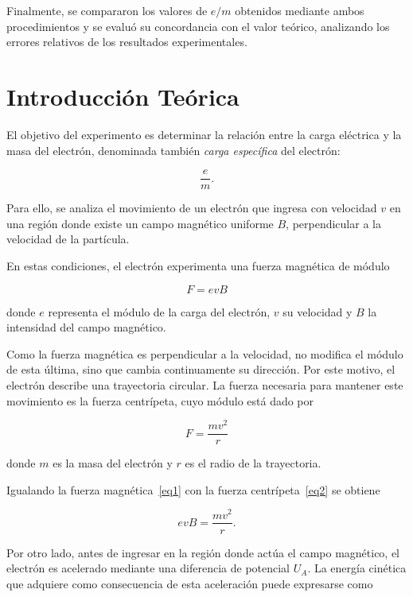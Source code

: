 \documentclass{article}
\begin{document}
Finalmente, se compararon los valores de \(e/m\) obtenidos mediante ambos procedimientos y se evaluó su concordancia con el valor teórico, analizando los errores relativos de los resultados experimentales.


\section{Introducción Teórica}

El objetivo del experimento es determinar la relación entre la carga eléctrica y la masa del electrón, denominada también \textit{carga específica} del electrón:

\[
\frac{e}{m}.
\]

Para ello, se analiza el movimiento de un electrón que ingresa con velocidad \(v\) en una región donde existe un campo magnético uniforme \(B\), perpendicular a la velocidad de la partícula.

En estas condiciones, el electrón experimenta una fuerza magnética de módulo

\begin{equation}
    F = evB
    \label{eq1}
\end{equation}

donde \(e\) representa el módulo de la carga del electrón, \(v\) su velocidad y \(B\) la intensidad del campo magnético.

Como la fuerza magnética es perpendicular a la velocidad, no modifica el módulo de esta última, sino que cambia continuamente su dirección. Por este motivo, el electrón describe una trayectoria circular. La fuerza necesaria para mantener este movimiento es la fuerza centrípeta, cuyo módulo está dado por

\begin{equation}
    F = \frac{mv^2}{r}
    \label{eq2}
\end{equation}

donde \(m\) es la masa del electrón y \(r\) es el radio de la trayectoria.

Igualando la fuerza magnética~\ref{eq1} con la fuerza centrípeta~\ref{eq2} se obtiene

\begin{equation}
    evB = \frac{mv^2}{r}.
    \label{eq3}
\end{equation}

Por otro lado, antes de ingresar en la región donde actúa el campo magnético, el electrón es acelerado mediante una diferencia de potencial \(U_A\). La energía cinética que adquiere como consecuencia de esta aceleración puede expresarse como
\end{document}
